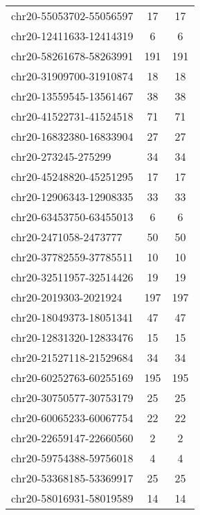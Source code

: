 \begin{longtable}{lSS}
	chr20-55053702-55056597 & 17     & 17                         \\
	chr20-12411633-12414319 & 6      & 6                          \\
	chr20-58261678-58263991 & 191    & 191                        \\
	chr20-31909700-31910874 & 18     & 18                         \\
	chr20-13559545-13561467 & 38     & 38                         \\
	chr20-41522731-41524518 & 71     & 71                         \\
	chr20-16832380-16833904 & 27     & 27                         \\
	chr20-273245-275299     & 34     & 34                         \\
	chr20-45248820-45251295 & 17     & 17                         \\
	chr20-12906343-12908335 & 33     & 33                         \\
	chr20-63453750-63455013 & 6      & 6                          \\
	chr20-2471058-2473777   & 50     & 50                         \\
	chr20-37782559-37785511 & 10     & 10                         \\
	chr20-32511957-32514426 & 19     & 19                         \\
	chr20-2019303-2021924   & 197    & 197                        \\
	chr20-18049373-18051341 & 47     & 47                         \\
	chr20-12831320-12833476 & 15     & 15                         \\
	chr20-21527118-21529684 & 34     & 34                         \\
	chr20-60252763-60255169 & 195    & 195                        \\
	chr20-30750577-30753179 & 25     & 25                         \\
	chr20-60065233-60067754 & 22     & 22                         \\
	chr20-22659147-22660560 & 2      & 2                          \\
	chr20-59754388-59756018 & 4      & 4                          \\
	chr20-53368185-53369917 & 25     & 25                         \\
	chr20-58016931-58019589 & 14     & 14                         \\

\end{longtable}
